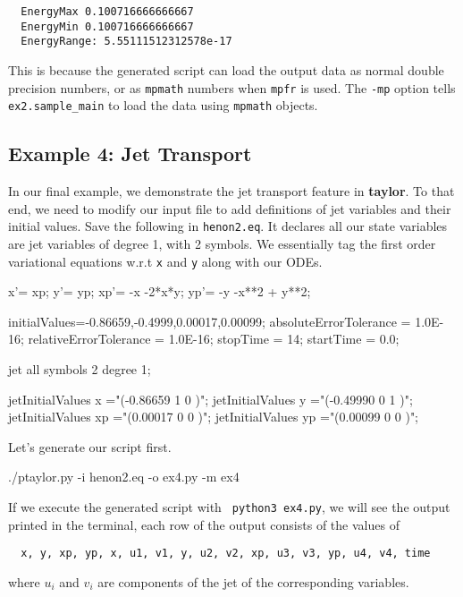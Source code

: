 \documentclass[10pt]{article}
\theoremstyle{remark}
\newcommand{\taylorname}{{\bf taylor}}
\begin{document}
\begin{verbatim}
  EnergyMax 0.100716666666667
  EnergyMin 0.100716666666667
  EnergyRange: 5.55111512312578e-17
\end{verbatim}

This is because the generated script can load the output data as
normal double precision numbers, or as {\tt mpmath} numbers when {\tt mpfr} is
used. The \verb+-mp+ option tells \verb+ex2.sample_main+ to load the data
using {\tt mpmath} objects.


\subsection{Example 4: Jet Transport}

In our final example, we demonstrate the jet transport feature in
\taylorname{}. To that end, we need to modify our input file to add
definitions of jet variables and their initial values. Save the
following in \verb+henon2.eq+. It declares all our state variables are
jet variables of degree 1, with 2 symbols. We essentially tag the
first order variational equations w.r.t \verb+x+ and \verb+y+ along with our ODEs.

{\footnotesize{
\begin{code}[title={File {\tt henon2.eq}}]
x'= xp;
y'= yp;
xp'= -x -2*x*y;
yp'= -y -x**2 + y**2;

initialValues=-0.86659,-0.4999,0.00017,0.00099;
absoluteErrorTolerance = 1.0E-16;
relativeErrorTolerance = 1.0E-16;
stopTime = 14;
startTime = 0.0;

jet all symbols 2 degree 1;

jetInitialValues x ="(-0.86659   1 0  )";
jetInitialValues y ="(-0.49990   0 1  )";
jetInitialValues xp ="(0.00017   0 0  )";
jetInitialValues yp ="(0.00099   0 0  )";
\end{code}
}}

Let's generate our script first.
\begin{command}
  ./ptaylor.py -i henon2.eq -o ex4.py -m ex4
\end{command}
If we execute the generated script with \verb+ python3 ex4.py+, we
will see the output printed in the terminal, each row of the output
consists of the values of
\begin{verbatim}
  x, y, xp, yp, x, u1, v1, y, u2, v2, xp, u3, v3, yp, u4, v4, time
\end{verbatim}

where $u_i$ and $v_i$ are components of the jet of the corresponding variables.
\end{document}
